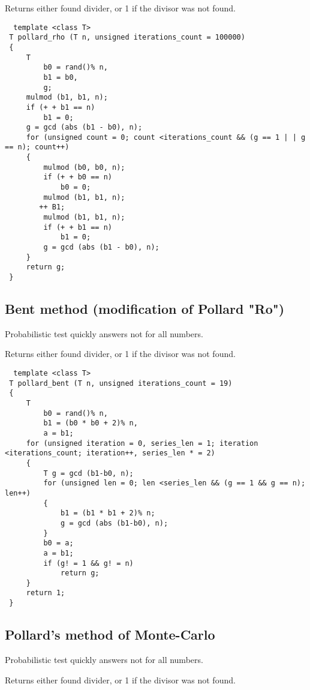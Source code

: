 Returns either found divider, or 1 if the divisor was not found.

\begin{verbatim}  template <class T>
 T pollard_rho (T n, unsigned iterations_count = 100000)
 {
     T
         b0 = rand()% n,
         b1 = b0,
         g;
     mulmod (b1, b1, n);
     if (+ + b1 == n)
         b1 = 0;
     g = gcd (abs (b1 - b0), n);
     for (unsigned count = 0; count <iterations_count && (g == 1 | | g == n); count++)
     {
         mulmod (b0, b0, n);
         if (+ + b0 == n)
             b0 = 0;
         mulmod (b1, b1, n);
        ++ B1;
         mulmod (b1, b1, n);
         if (+ + b1 == n)
             b1 = 0;
         g = gcd (abs (b1 - b0), n);
     }
     return g;
 } 
\end{verbatim}\subsection{ Bent method (modification of Pollard "Ro") }
Probabilistic test quickly answers not for all numbers.

Returns either found divider, or 1 if the divisor was not found.

\begin{verbatim}  template <class T>
 T pollard_bent (T n, unsigned iterations_count = 19)
 {
     T
         b0 = rand()% n,
         b1 = (b0 * b0 + 2)% n,
         a = b1;
     for (unsigned iteration = 0, series_len = 1; iteration <iterations_count; iteration++, series_len * = 2)
     {
         T g = gcd (b1-b0, n);
         for (unsigned len = 0; len <series_len && (g == 1 && g == n); len++)
         {
             b1 = (b1 * b1 + 2)% n;
             g = gcd (abs (b1-b0), n);
         }
         b0 = a;
         a = b1;
         if (g! = 1 && g! = n)
             return g;
     }
     return 1;
 } 
\end{verbatim}\subsection{ Pollard's method of Monte-Carlo }
Probabilistic test quickly answers not for all numbers.

Returns either found divider, or 1 if the divisor was not found.


